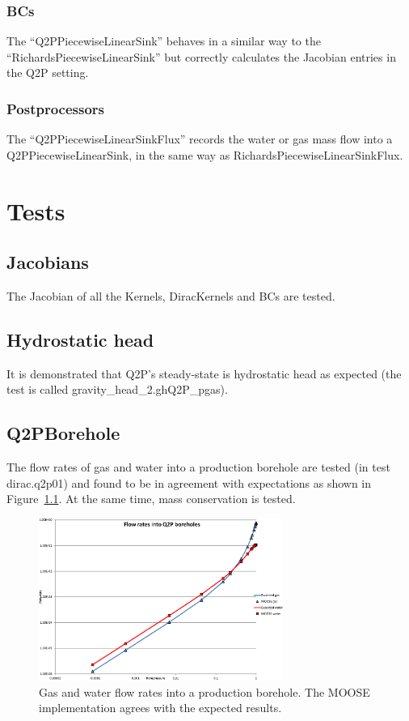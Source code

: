 \documentclass[]{scrreprt}
\begin{document}
\subsection{BCs}

The ``Q2PPiecewiseLinearSink'' behaves in a similar way to the
``RichardsPiecewiseLinearSink'' but correctly calculates the Jacobian
entries in the Q2P setting.


\subsection{Postprocessors}

The ``Q2PPiecewiseLinearSinkFlux'' records the water or gas mass flow
into a Q2PPiecewiseLinearSink, in the same way as
RichardsPiecewiseLinearSinkFlux.



\chapter{Tests}

\section{Jacobians}

The Jacobian of all the Kernels, DiracKernels and BCs are tested.

\section{Hydrostatic head}

It is demonstrated that Q2P's steady-state is hydrostatic head as
expected (the test is called gravity\_head\_2.ghQ2P\_pgas).

\section{Q2PBorehole}

The flow rates of gas and water into a production borehole are tested
(in test dirac.q2p01)
and found to be in agreement with expectations as shown in
Figure~\ref{bh.fig}.  At the same time, mass conservation is tested.

\begin{figure}[htb]
\centering
\includegraphics[width=8cm]{bh.eps}
\caption{Gas and water flow rates into a production borehole.  The
  MOOSE implementation agrees with the expected results.}
\label{bh.fig}
\end{figure}
\end{document}
